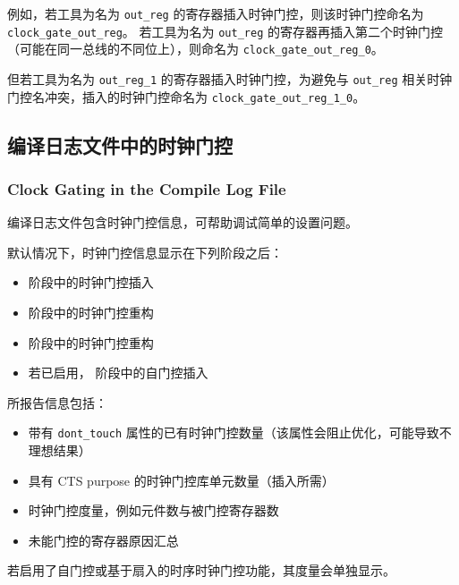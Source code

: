 例如，若工具为名为 \texttt{out\_reg} 的寄存器插入时钟门控，则该时钟门控命名为 \texttt{clock\_gate\_out\_reg}。
若工具为名为 \texttt{out\_reg} 的寄存器再插入第二个时钟门控（可能在同一总线的不同位上），则命名为 \texttt{clock\_gate\_out\_reg\_0}。

但若工具为名为 \texttt{out\_reg\_1} 的寄存器插入时钟门控，为避免与 \texttt{out\_reg} 相关时钟门控名冲突，插入的时钟门控命名为 \texttt{clock\_gate\_out\_reg\_1\_0}。

\subsection{编译日志文件中的时钟门控}
\subsubsection*{Clock Gating in the Compile Log File}

编译日志文件包含时钟门控信息，可帮助调试简单的设置问题。

默认情况下，时钟门控信息显示在下列阶段之后：
\begin{itemize}
  \item {} 阶段中的时钟门控插入
  \item {} 阶段中的时钟门控重构
  \item {} 阶段中的时钟门控重构
  \item 若已启用， 阶段中的自门控插入
\end{itemize}

所报告信息包括：
\begin{itemize}
  \item 带有 \texttt{dont\_touch} 属性的已有时钟门控数量（该属性会阻止优化，可能导致不理想结果）
  \item 具有 CTS purpose 的时钟门控库单元数量（插入所需）
  \item 时钟门控度量，例如元件数与被门控寄存器数
  \item 未能门控的寄存器原因汇总
\end{itemize}

若启用了自门控或基于扇入的时序时钟门控功能，其度量会单独显示。

